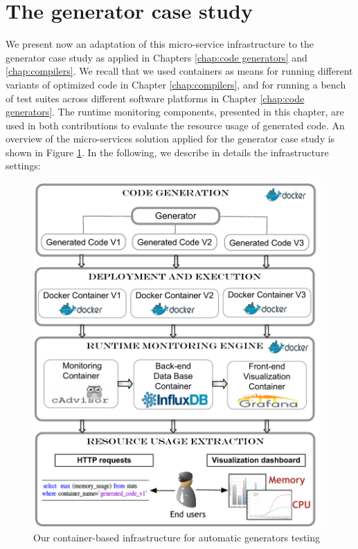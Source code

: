 \section{The generator case study}
\label{mon:case study}
We present now an adaptation of this micro-service infrastructure to the generator case study as applied in Chapters \ref{chap:code generators} and \ref{chap:compilers}. We recall that we used containers as means for running different variants of optimized code in Chapter \ref{chap:compilers}, and for running a bench of test suites across different software platforms in Chapter \ref{chap:code generators}. 
The runtime monitoring components, presented in this chapter, are used in both contributions to evaluate the resource usage of generated code. 
An overview of the micro-services solution applied for the generator case study is shown in Figure \ref{mon:infra}. In the following, we describe in details the infrastructure settings:
\begin{figure}[h]
	\centering
	\includegraphics[width=0.75\linewidth]{chapitre5/fig/infra_summary}
	\caption{Our container-based infrastructure for automatic generators testing}
	\label{mon:infra}
\end{figure}


